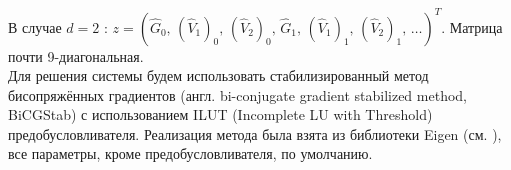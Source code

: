В случае $d = 2$ : $z = (\widehat{G}_0, \, (\widehat{V}_1)_0, \, (\widehat{V}_2)_0, \, 
                         \widehat{G}_1, \, (\widehat{V}_1)_1, \, (\widehat{V}_2)_1, \, \ldots)^T$.
Матрица почти 9-диагональная. \\

Для решения системы будем использовать стабилизированный метод бисопряжённых градиентов (англ. bi-conjugate gradient stabilized method, BiCGStab) с использованием ILUT (Incomplete LU with Threshold) предобусловливателя.
Реализация метода была взята из библиотеки Eigen (см. \cite{Eigen}), все параметры, кроме предобусловливателя, по умолчанию.


